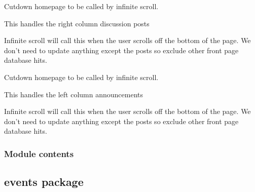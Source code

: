 \documentclass[letterpaper,10pt,english]{sphinxmanual}
\begin{document}

\begin{fulllineitems}
\label{\detokenize{dashboard:dashboard.views.scroll1}}
Cutdown homepage to be called by infinite scroll.

This handles the right column \sphinxhyphen{} discussion posts

Infinite scroll will call this when the user scrolls off the bottom
of the page. We don’t need to update anything except the posts so exclude
other front page database hits.

\end{fulllineitems}


\begin{fulllineitems}
\label{\detokenize{dashboard:dashboard.views.scroll2}}
Cutdown homepage to be called by infinite scroll.

This handles the left column \sphinxhyphen{} announcements

Infinite scroll will call this when the user scrolls off the bottom
of the page. We don’t need to update anything except the posts so exclude
other front page database hits.

\end{fulllineitems}



\subsubsection{Module contents}
\label{\detokenize{dashboard:module-dashboard}}\label{\detokenize{dashboard:module-contents}}

\subsection{events package}
\label{\detokenize{events:events-package}}\label{\detokenize{events::doc}}
\end{document}
